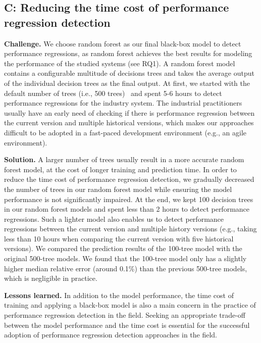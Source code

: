 \subsection*{C: Reducing the time cost of performance regression detection}
\noindent\textbf{Challenge.}
We choose random forest as our final black-box model to detect performance regressions, as random forest achieves the best results for modeling the performance of the studied systems (see RQ1).
A random forest model contains a configurable multitude of decisions trees and takes the average output of the individual decision trees as the final output.
At first, we started with the default number of trees (i.e., 500 trees)~\citep{R-RandomForest} and spent 5-6 hours to detect performance regressions for the industry system. 
The industrial practitioners usually have an early need of checking if there is performance regression between the current version and multiple historical versions, which makes our approaches difficult to be adopted in a fast-paced development environment (e.g., an agile environment).

\noindent\textbf{Solution.}
A larger number of trees usually result in a more accurate random forest model, at the cost of longer training and prediction time.
In order to reduce the time cost of performance regression detection, we gradually decreased the number of trees in our random forest model while ensuring the model performance is not significantly impaired.
At the end, we kept 100 decision trees in our random forest models and spent less than 2 hours to detect performance regressions.
Such a lighter model also enables us to detect performance regressions between the current version and multiple history versions (e.g., taking less than 10 hours when comparing the current version with five historical versions). 
We compared the prediction results of the 100-tree model with the original 500-tree models. We found that the 100-tree model only has a slightly higher median relative error (around 0.1\%) than the previous 500-tree models, which is negligible in practice.

\noindent\textbf{Lessons learned.}
In addition to the model performance, the time cost of training and applying a black-box model is also a main concern in the practice of performance regression detection in the field.
Seeking an appropriate trade-off between the model performance and the time cost is essential for the successful adoption of performance regression detection approaches in the field.



